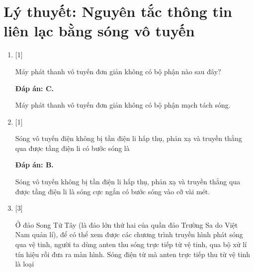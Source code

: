\section{Lý thuyết: Nguyên tắc thông tin liên lạc bằng sóng vô tuyến}
\begin{enumerate}[label=\bfseries Câu \arabic*:]

	\item {} [1]
	
	
	{Máy phát thanh vô tuyến đơn giản không có bộ phận nào sau đây?
	}
	
	\hideall
	{		\textbf{Đáp án: C.}
		
Máy phát thanh vô tuyến đơn giản không có bộ phận mạch tách sóng.
	} 
	
	\item {} [1]
	
	
	{Sóng vô tuyến điện không bị tần điện li hấp thụ, phản xạ và truyền thẳng qua được tầng điện li có bước sóng là
	}
	
	\hideall
	{		\textbf{Đáp án: B.}
		
Sóng vô tuyến không bị tần điện li hấp thụ, phản xạ và truyền thẳng qua được tầng điện li là sóng cực ngắn có bước sóng vào cỡ vài mét.
		
	}

	\item {} [3]
	
	
	{Ở đảo Song Tử Tây (là đảo lớn thứ hai của quần đảo Trường Sa do Việt Nam quản lí), để có thể xem được các chương trình truyền hình phát sóng qua vệ tinh, người ta dùng anten thu sóng trực tiếp từ vệ tinh, qua bộ xử lí tín hiệu rồi đưa ra màn hình. Sóng điện từ mà anten trực tiếp thu từ vệ tinh là loại 
	}
	

\end{enumerate}
